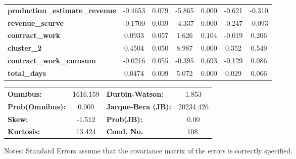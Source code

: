 \begin{center}
\begin{tabular}{lcccccc}
\textbf{production\_estimate\_revenue} &      -0.4653  &        0.079     &    -5.865  &         0.000        &       -0.621    &       -0.310     \\
\textbf{revenue\_scurve}               &      -0.1700  &        0.039     &    -4.337  &         0.000        &       -0.247    &       -0.093     \\
\textbf{contract\_work}                &       0.0933  &        0.057     &     1.626  &         0.104        &       -0.019    &        0.206     \\
\textbf{cluster\_2}                    &       0.4504  &        0.050     &     8.987  &         0.000        &        0.352    &        0.549     \\
\textbf{contract\_work\_cumsum}        &      -0.0216  &        0.055     &    -0.395  &         0.693        &       -0.129    &        0.086     \\
\textbf{total\_days}                   &       0.0474  &        0.009     &     5.072  &         0.000        &        0.029    &        0.066     \\
\bottomrule
\end{tabular}
\begin{tabular}{lclc}
\textbf{Omnibus:}       & 1616.159 & \textbf{  Durbin-Watson:     } &     1.853  \\
\textbf{Prob(Omnibus):} &   0.000  & \textbf{  Jarque-Bera (JB):  } & 20234.426  \\
\textbf{Skew:}          &  -1.512  & \textbf{  Prob(JB):          } &      0.00  \\
\textbf{Kurtosis:}      &  13.424  & \textbf{  Cond. No.          } &      108.  \\
\bottomrule
\end{tabular}
\end{center}

Notes: \newline
 [1] Standard Errors assume that the covariance matrix of the errors is correctly specified.